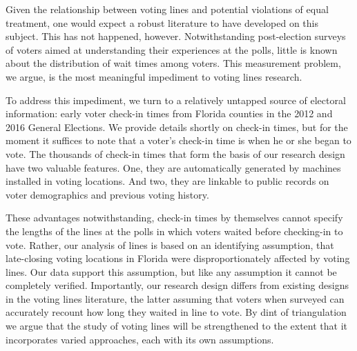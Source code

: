 \documentclass[12pt,titlepage]{article}
\begin{document}
Given the relationship between voting lines and potential violations
of equal treatment, one would expect a robust literature to have
developed on this subject.  This has not happened, however.
Notwithstanding post-election surveys of voters aimed at understanding
their experiences at the polls, little is known about the distribution
of wait times among voters. This measurement problem, we argue, is the
most meaningful impediment to voting lines research.

To address this impediment, we turn to a relatively untapped source of
electoral information: early voter check-in times from Florida
counties in the 2012 and 2016 General Elections. We provide details
shortly on check-in times, but for the moment it suffices to note that
a voter's check-in time is when he or she began to vote. The thousands
of check-in times that form the basis of our research design have two
valuable features. One, they are automatically generated by machines
installed in voting locations. And two, they are linkable to public
records on voter demographics and previous voting history.

These advantages notwithstanding, check-in times by themselves cannot
specify the lengths of the lines at the polls in which voters waited
before checking-in to vote.  Rather, our analysis of lines is based on
an identifying assumption, that late-closing voting locations in
Florida were disproportionately affected by voting lines. Our data
support this assumption, but like any assumption it cannot be
completely verified.  Importantly, our research design differs from
existing designs in the voting lines literature, the latter assuming
that voters when surveyed can accurately recount how long they waited
in line to vote. By dint of triangulation we argue that the study of
voting lines will be strengthened to the extent that it incorporates
varied approaches, each with its own assumptions.

\end{document}
